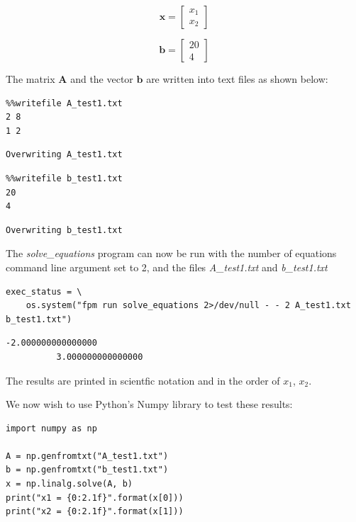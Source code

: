 \begin{equation}
\mathbf{x} = 
\left[
\begin{array}{c}
x_1 \\
x_2  
\end{array}
\right]
\end{equation}

\begin{equation}
\mathbf{b} = 
\left[
\begin{array}{c}
20 \\
4  
\end{array}
\right]
\end{equation}

The matrix $\mathbf{A}$ and the vector $\mathbf{b}$ are written into text files as shown below:

\begin{verbatim}
%%writefile A_test1.txt
2 8
1 2
\end{verbatim}

\begin{verbatim}
Overwriting A_test1.txt
\end{verbatim}

\begin{verbatim}
%%writefile b_test1.txt
20
4
\end{verbatim}

\begin{verbatim}
Overwriting b_test1.txt
\end{verbatim}

The \textit{solve\_equations} program can now be run with the number of equations command line argument set to 2, and the files \textit{A\_test1.txt} and \textit{b\_test1.txt}

\begin{verbatim}
exec_status = \
    os.system("fpm run solve_equations 2>/dev/null - - 2 A_test1.txt b_test1.txt")
\end{verbatim}

\begin{verbatim}
-2.000000000000000
          3.000000000000000
\end{verbatim}

The results are printed in scientfic notation and in the order of $x_1$, $x_2$.

We now wish to use Python's Numpy library to test these results:

\begin{verbatim}
import numpy as np

A = np.genfromtxt("A_test1.txt")
b = np.genfromtxt("b_test1.txt")
x = np.linalg.solve(A, b)
print("x1 = {0:2.1f}".format(x[0]))
print("x2 = {0:2.1f}".format(x[1]))
\end{verbatim}

